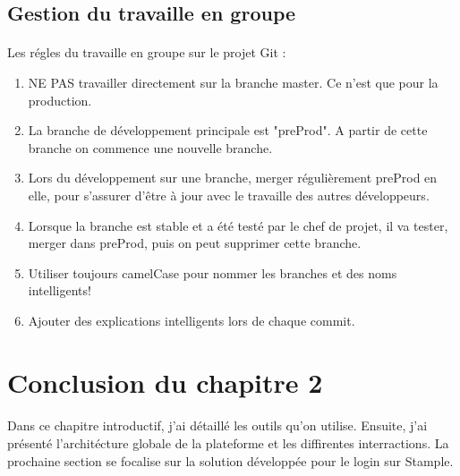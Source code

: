 \subsection{Gestion du travaille en groupe}
\paragraph{}
Les régles du travaille en groupe sur le projet Git :
\begin{enumerate}
\item NE PAS travailler directement sur la branche master. Ce n'est que pour la production.
\item La branche de développement principale est "preProd". A partir de cette branche on commence une nouvelle branche. 
\item Lors du développement sur une branche, merger régulièrement preProd en elle, pour s'assurer d'être à jour avec le travaille des autres développeurs.
\item Lorsque la branche est stable et a été testé par le chef de projet, il va tester, merger dans preProd, puis on peut supprimer cette branche.
\item Utiliser toujours camelCase pour nommer les branches et des noms intelligents!
\item Ajouter des explications intelligents lors de chaque commit.
\end{enumerate}
\section{Conclusion du chapitre 2}
\paragraph{}
Dans ce chapitre introductif, j'ai détaillé les outils qu'on utilise. Ensuite, j'ai présenté l'architécture globale de la plateforme et les diffirentes interractions. La prochaine section se focalise sur la solution développée pour le login sur Stample.
